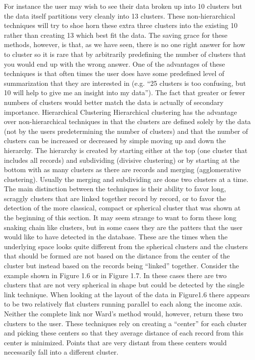 For instance the user may wish to see their data broken up into 10 clusters but the data itself partitions very cleanly into 13 clusters.  These non-hierarchical techniques will try to shoe horn these extra three clusters into the existing 10 rather than creating 13 which best fit the data.  The saving grace for these methods, however, is that, as we have seen, there is no one right answer for how to cluster so it is rare that by arbitrarily predefining the number of clusters that you would end up with the wrong answer.  One of the advantages of these techniques is that often times the user does have some predefined level  of summarization that they are interested in (e.g. “25 clusters is too confusing, but 10 will help to give me an insight into my data”).  The fact that greater or fewer numbers of clusters would better match the data is actually of secondary importance.
Hierarchical Clustering 
Hierarchical clustering has the advantage over non-hierarchical techniques in that the clusters are defined solely by the data (not by the users predetermining the number of clusters) and that the number of clusters can be increased or decreased by simple moving up and down the hierarchy.
The hierarchy is created by starting either at the top (one cluster that includes all records) and subdividing (divisive clustering) or by starting at the bottom with as many clusters as there are records and merging (agglomerative clustering).  Usually the merging and subdividing are done two clusters at a time.
The main distinction between the techniques is their ability to favor long, scraggly clusters that are linked together record by record, or to favor the detection of the more classical, compact or spherical cluster that was shown at the beginning of this section.  It may seem strange to want to form these long snaking chain like clusters, but in some cases they are the patters that the user would like to have detected in the database.  These are the times when the underlying space looks quite different from the spherical clusters and the clusters that should be formed are not based on the distance from the center of the cluster but instead based on the records being “linked” together.  Consider the example shown in Figure 1.6 or in Figure 1.7.  In these cases there are two clusters that are not very spherical in shape but could be detected by the single link technique.
When looking at the layout of the data in Figure1.6  there appears to be two relatively flat clusters running parallel to each along the income axis.  Neither the complete link nor Ward’s method would, however, return these two clusters to the user.  These techniques rely on creating a “center” for each cluster and picking these centers so that they average distance of each record from this center is minimized. Points that are very distant from these centers would necessarily fall into a different cluster.

